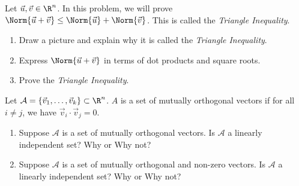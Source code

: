 \begin{exercises}
\begin{problist}
		\prob Let $\vec u, \vec v \in \R^{n}$. In this problem, we will prove
		$\Norm{\vec u + \vec v}\leq \Norm{\vec u}+ \Norm{\vec v}$. This is called the
		\emph{Triangle Inequality}.
		\begin{enumerate}
			\item Draw a picture and explain why it is called the \emph{Triangle Inequality}.

			\item Express $\Norm{\vec u + \vec v}$ in terms of dot products and
				square roots.

			\item Prove the \emph{Triangle Inequality}.
		\end{enumerate}

		\prob Let $\mathcal{A}= \{\vec v_{1},\dots , \vec v_{k}\} \subset \R^{n}$.
		$A$ is a set of mutually orthogonal vectors if for all $i \neq j$, we have
		$\vec v_{i}\cdot \vec v_{j}= 0$.
		\begin{enumerate}
			\item Suppose $\mathcal{A}$ is a set of mutually orthogonal vectors.
				Is $\mathcal{A}$ a linearly independent set? Why or Why not?

			\item Suppose $\mathcal{A}$ is a set of mutually orthogonal and non-zero
				vectors. Is $\mathcal{A}$ a linearly independent set? Why or Why
				not?
		\end{enumerate}
	\end{problist}
\end{exercises}
